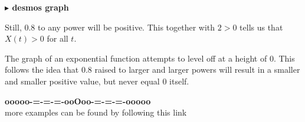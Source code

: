 \documentclass{ximera}
\begin{document}
\begin{example}
\begin{onlineOnly}
\textbf{\textcolor{blue!55!black}{$\blacktriangleright$ desmos graph}} 
\begin{center}
\end{center}
\end{onlineOnly}




Still, $0.8$ to any power will be positive.  This together with $2>0$ tells us that $X(t) > 0$ for all $t$.


\end{example}

The graph of an exponential function attempts to level off at a height of $0$.  This follows the idea that $0.8$ raised to larger and larger powers will result in a smaller and smaller positive value, but never equal $0$ itself.































\begin{center}
\textbf{\textcolor{green!50!black}{ooooo-=-=-=-ooOoo-=-=-=-ooooo}} \\

more examples can be found by following this link\\ 

\end{center}
\end{document}
